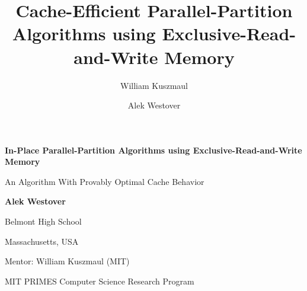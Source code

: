 \documentclass[11pt]{article}
\theoremstyle{remark}
\theoremstyle{remark}
\begin{document}
\title{Cache-Efficient Parallel-Partition Algorithms using Exclusive-Read-and-Write Memory}

\author{William Kuszmaul}


\author{Alek Westover}


\begin{titlepage}
    \begin{center}
        \vspace*{1cm}
 
        \Huge
        \textbf{In-Place Parallel-Partition Algorithms using Exclusive-Read-and-Write Memory}
 
        \vspace{0.5cm}
        \LARGE
				An Algorithm With Provably Optimal Cache Behavior
 
        \vspace{1.5cm}
				\vfill
 
        \textbf{Alek Westover}

        \vspace{1.5cm}
				Belmont High School

				Massachusetts, USA

        \vspace{1.5cm}
				Mentor: William Kuszmaul (MIT)
 
        \vspace{0.8cm}
				MIT PRIMES Computer Science Research Program
 
 
        \Large
 
    \end{center}
\end{titlepage}
\end{document}
